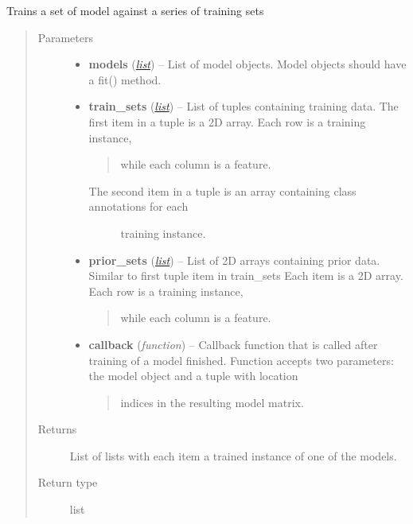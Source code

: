 \documentclass[letterpaper,10pt,english]{sphinxmanual}
\begin{document}
\begin{fulllineitems}
\label{flamingo/classification/index:flamingo.classification.models.train_models}
Trains a set of model against a series of training sets
\begin{quote}\begin{description}
\item[{Parameters}] \leavevmode\begin{itemize}
\item {} 
\textbf{models} (\href{http://docs.python.org/library/functions.html\#list}{\emph{list}}) -- List of model objects. Model objects should have a fit() method.

\item {} 
\textbf{train\_sets} (\href{http://docs.python.org/library/functions.html\#list}{\emph{list}}) -- 
List of tuples containing training data.
The first item in a tuple is a 2D array. Each row is a training instance,
\begin{quote}

while each column is a feature.
\end{quote}
\begin{description}
\item[{The second item in a tuple is an array containing class annotations for each}] \leavevmode
training instance.

\end{description}


\item {} 
\textbf{prior\_sets} (\href{http://docs.python.org/library/functions.html\#list}{\emph{list}}) -- 
List of 2D arrays containing prior data.
Similar to first tuple item in train\_sets
Each item is a 2D array. Each row is a training instance,
\begin{quote}

while each column is a feature.
\end{quote}


\item {} 
\textbf{callback} (\emph{function}) -- 
Callback function that is called after training of a model finished.
Function accepts two parameters: the model object and a tuple with location
\begin{quote}

indices in the resulting model matrix.
\end{quote}


\end{itemize}

\item[{Returns}] \leavevmode
List of lists with each item a trained instance of one of the models.

\item[{Return type}] \leavevmode
list

\end{description}\end{quote}

\end{fulllineitems}
\end{document}
